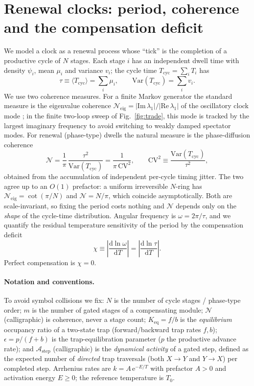 \documentclass[11pt,onecolumn]{article}
\theoremstyle{definition}
\newcommand{\CV}{\mathrm{CV}}
\newcommand{\Ncoh}{\mathcal{N}}
\newcommand{\Aact}{\mathcal{A}}
\newcommand{\Keq}{K_{\mathrm{eq}}}
\newcommand{\dd}{\mathrm{d}}
\newcommand{\ee}{\mathrm{e}}
\newcommand{\Tzero}{T_0}
\begin{document}
\section{Renewal clocks: period, coherence and the compensation deficit}
\label{sec:setup}

We model a clock as a renewal process whose ``tick'' is the completion of a productive cycle of $N$ stages. Each stage $i$ has an independent dwell time with density $\psi_i$, mean $\mu_i$ and variance $v_i$; the cycle time $T_{\mathrm{cyc}}=\sum_i T_i$ has
\begin{equation}
\tau \equiv \langle T_{\mathrm{cyc}}\rangle = \sum_i \mu_i,
\qquad
\mathrm{Var}(T_{\mathrm{cyc}}) = \sum_i v_i .
\end{equation}
We use two coherence measures. For a finite Markov generator the standard measure is the eigenvalue coherence $\Ncoh_{\mathrm{eig}}=|\mathrm{Im}\,\lambda_1|/|\mathrm{Re}\,\lambda_1|$ of the oscillatory clock mode \cite{BaratoSeifert2017}; in the finite two-loop sweep of Fig.~\ref{fig:trade}, this mode is tracked by the largest imaginary frequency to avoid switching to weakly damped spectator modes. For renewal (phase-type) dwells the natural measure is the phase-diffusion coherence
\begin{equation}
\Ncoh = \frac{1}{\pi}\,\frac{\tau^2}{\mathrm{Var}(T_{\mathrm{cyc}})}
= \frac{1}{\pi\,\CV^2},
\qquad
\CV^2 \equiv \frac{\mathrm{Var}(T_{\mathrm{cyc}})}{\tau^2},
\label{eq:Ndef}
\end{equation}
obtained from the accumulation of independent per-cycle timing jitter. The two agree up to an $O(1)$ prefactor: a uniform irreversible $N$-ring has $\Ncoh_{\mathrm{eig}}=\cot(\pi/N)$ and $\Ncoh = N/\pi$, which coincide asymptotically. Both are scale-invariant, so fixing the period costs nothing and $\Ncoh$ depends only on the \emph{shape} of the cycle-time distribution. Angular frequency is $\omega=2\pi/\tau$, and we quantify the residual temperature sensitivity of the period by the compensation deficit
\begin{equation}
\chi \equiv \left|\frac{\dd\ln\omega}{\dd T}\right| = \left|\frac{\dd\ln\tau}{\dd T}\right| .
\end{equation}
Perfect compensation is $\chi=0$.

\paragraph{Notation and conventions.} To avoid symbol collisions we fix: $N$ is the number of cycle stages / phase-type order; $m$ is the number of gated stages of a compensating module; $\Ncoh$ (calligraphic) is coherence, never a stage count; $\Keq=f/b$ is the \emph{equilibrium} occupancy ratio of a two-state trap (forward/backward trap rates $f,b$); $\epsilon=p/(f+b)$ is the trap-equilibration parameter ($p$ the productive advance rate); and $\Aact_{\mathrm{step}}$ (calligraphic) is the \emph{dynamical activity} of a gated step, defined as the expected number of \emph{directed} trap traversals (both $X\to Y$ and $Y\to X$) per completed step. Arrhenius rates are $k=A\,\ee^{-E/T}$ with prefactor $A>0$ and activation energy $E\ge 0$; the reference temperature is $\Tzero$.
\end{document}
